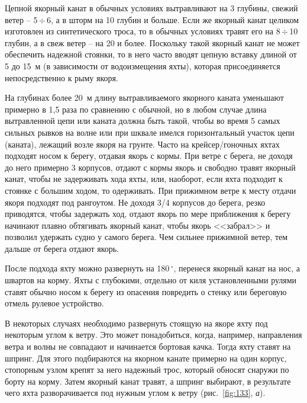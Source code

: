 \documentclass[a4paper, 12pt, twoside, final, book, russian, fittopage, cyremdash]{ncc}
\newcommand{\gr}{\ensuremath{\,^\circ}\xspace}
\newcommand{\otdo}{\,\ensuremath{\div}\,}
\newcommand{\ris}[1]{\ref{fig:#1}}
\begin{document}
Цепной якорный канат в обычных условиях вытравливают на 3 глубины, свежий ветер \--- 5\otdo 6, а в шторм на 10 глубин и больше. Если же якорный канат целиком изготовлен из синтетического троса, то в обычных условиях травят его на 8\otdo 10 глубин, а в свеж ветер \--- на 20 и более. Поскольку такой якорный канат не может обеспечить надежной стоянки, то в него часто вводят цепную вставку длиной от 5 до 15~м (в зависимости от водоизмещения яхты), которая присоединяется непосредственно к рыму якоря.

На глубинах более 20~м длину вытравливаемого якорного каната уменьшают примерно в 1,5 раза по сравнению с обычной, но в любом случае длина вытравленной цепи или каната должна быть такой, чтобы во время 5 самых сильных рывков на волне или при шквале имелся горизонтальный участок цепи (каната), лежащий возле якоря на грунте. Часто на крейсер\-/гоночных яхтах подходят носом к берегу, отдавая якорь с кормы. При ветре с берега, не доходя до него примерно 3 корпусов, отдают с кормы якорь и свободно травят якорный канат, чтобы не задерживать хода яхты, или, наоборот, если яхта подходит к стоянке с большим ходом, то одерживать. При прижимном ветре к месту отдачи якоря подходят под рангоутом. Не доходя 3\-/4 корпусов до берега, резко приводятся, чтобы задержать ход, отдают якорь по мере приближения к берегу начинают плавно обтягивать якорный канат, чтобы якорь <<забрал>> и позволил удержать судно у самого берега. Чем сильнее прижимной ветер, тем дальше от берега отдают якорь.

После подхода яхту можно развернуть на 180\gr, перенеся якорный канат на нос, а швартов на корму. Яхты с глубокими, отдельно от киля установленными рулями ставят обычно носом к берегу из опасения повредить о стенку или береговую отмель рулевое устройство.

В некоторых случаях необходимо развернуть стоящую на якоре яхту под некоторым углом к ветру. Это может понадобиться, когда, например, направления ветра и волны не совпадают и начинается бортовая качка. Тогда яхту ставят на шпринг. Для этого подбираются на якорном канате примерно на один корпус, стопорным узлом крепят за него надежный трос, который обносят снаружи по борту на корму. Затем якорный канат травят, а шпринг выбирают, в результате чего яхта разворачивается под нужным углом к ветру (рис.~\ris{133}, \textit{а}).
\end{document}
